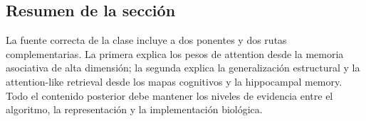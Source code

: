 \subsection{Resumen de la sección}

La fuente correcta de la clase incluye a dos ponentes y dos rutas complementarias. La primera explica los pesos de attention desde la memoria asociativa de alta dimensión; la segunda explica la generalización estructural y la attention-like retrieval desde los mapas cognitivos y la hippocampal memory. Todo el contenido posterior debe mantener los niveles de evidencia entre el algoritmo, la representación y la implementación biológica.
